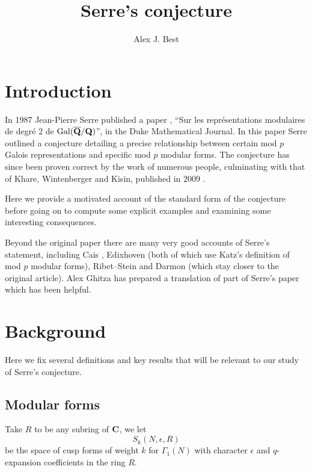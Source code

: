 \documentclass[a4paper,12pt]{article}
\title{Serre's conjecture} %
\author{Alex J. Best}
\begin{document}
\maketitle
\tableofcontents
\clearpage

\section{Introduction}
In 1987 Jean-Pierre Serre published a paper \cite{Serre87}, ``Sur les repr\'esentations modulaires de degr\'e 2 de $\operatorname{Gal}(\overline{\mathbf{Q}}/\mathbf{Q})$'', in the Duke Mathematical Journal.
In this paper Serre outlined a conjecture detailing a precise relationship between certain mod $p$ Galois representations and specific mod $p$ modular forms.
The conjecture has since been proven correct by the work of numerous people, culminating with that of Khare, Wintenberger and Kisin, published in 2009 \cite{KWI,KWII,Kisin}.

Here we provide a motivated account of the standard form of the conjecture before going on to compute some explicit examples and examining some interesting consequences.

Beyond the original paper there are many very good accounts of Serre's statement, including Cais \cite{Cais}, Edixhoven \cite{Edixhoven} (both of which use Katz's definition of mod $p$ modular forms), Ribet--Stein \cite{RibetStein} and Darmon \cite{Darmon} (which stay closer to the original article).
Alex Ghitza has prepared a translation of part of Serre's paper \cite{Ghitza} which has been helpful.


\section{Background}
Here we fix several definitions and key results that will be relevant to our study of Serre's conjecture.

\subsection{Modular forms}
\begin{defn}
Take $R$ to be any subring of $\mathbf{C}$, we let
\[
S_k(N, \epsilon, R)
\]
be the space of cusp forms of weight $k$ for $\Gamma_1(N)$ with character $\epsilon$ and $q$-expansion coefficients in the ring $R$.
\end{defn}
\end{document}
